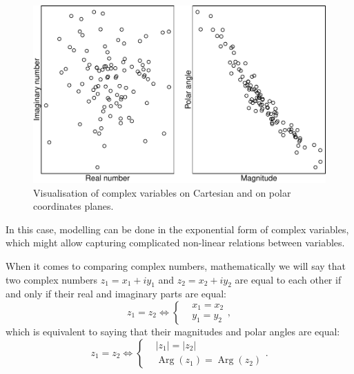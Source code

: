 \documentclass[
]{book}
\DeclareMathOperator\Arg{Arg}
\begin{document}
\begin{figure}
\centering
\includegraphics{Svetunkov---Svetunkov---Complex-Dynamic-Models_files/figure-latex/complexCartesianvsPolar-1.pdf}
\caption{\label{fig:complexCartesianvsPolar}Visualisation of complex variables on Cartesian and on polar coordinates planes.}
\end{figure}

In this case, modelling can be done in the exponential form of complex variables, which might allow capturing complicated non-linear relations between variables.

When it comes to comparing complex numbers, mathematically we will say that two complex numbers \(z_1 = x_1 + i y_1\) and \(z_2 = x_2 + i y_2\) are equal to each other if and only if their real and imaginary parts are equal:
\begin{equation*}
    z_1 = z_2 \iff \left \lbrace
    \begin{aligned}
        & x_1 = x_2 \\
        & y_1 = y_2
    \end{aligned}
    \right. ,
\end{equation*}
which is equivalent to saying that their magnitudes and polar angles are equal:
\begin{equation*}
    z_1 = z_2 \iff \left \lbrace
    \begin{aligned}
        & |z_1| = |z_2| \\
        & \Arg(z_1) = \Arg(z_2)
    \end{aligned}
    \right. .
\end{equation*}
\end{document}
